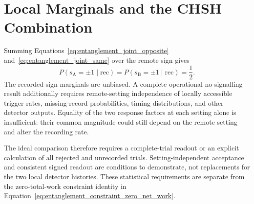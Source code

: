 \section{Local Marginals and the CHSH Combination}
\label{sec:entanglement_chsh}

Summing Equations~\eqref{eq:entanglement_joint_opposite} and~\eqref{eq:entanglement_joint_same} over the remote sign gives
\begin{equation}
    \boxed{
    P(s_{\mathrm A}=\pm1\mid\mathrm{rec})
    =P(s_{\mathrm B}=\pm1\mid\mathrm{rec})=\frac12
    }.
    \label{eq:entanglement_no_signalling_marginals}
\end{equation}
The recorded-sign marginals are unbiased. A complete operational no-signalling result additionally requires remote-setting independence of locally accessible trigger rates, missing-record probabilities, timing distributions, and other detector outputs. Equality of the two response factors at each setting alone is insufficient: their common magnitude could still depend on the remote setting and alter the recording rate.

The ideal comparison therefore requires a complete-trial readout or an explicit calculation of all rejected and unrecorded trials. Setting-independent acceptance and consistent signed readout are conditions to demonstrate, not replacements for the two local detector histories. These statistical requirements are separate from the zero-total-work constraint identity in Equation~\eqref{eq:entanglement_constraint_zero_net_work}.

